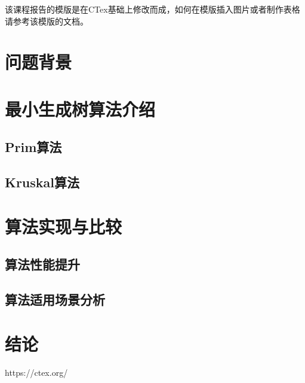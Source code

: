 \documentclass[a4paper,12pt]{ctexart}
\begin{document}
该课程报告的模版是在CTex\cite{ctex}基础上修改而成，如何在模版插入图片或者制作表格请参考该模版的文档。

\section{问题背景}

\section{最小生成树算法介绍}
\subsection{Prim算法}

\subsection{Kruskal算法}

\section{算法实现与比较}
\subsection{算法性能提升}

\subsection{算法适用场景分析}

\section{结论}
\begin{thebibliography}{9}
     https://ctex.org/
\end{thebibliography}
\end{document}
